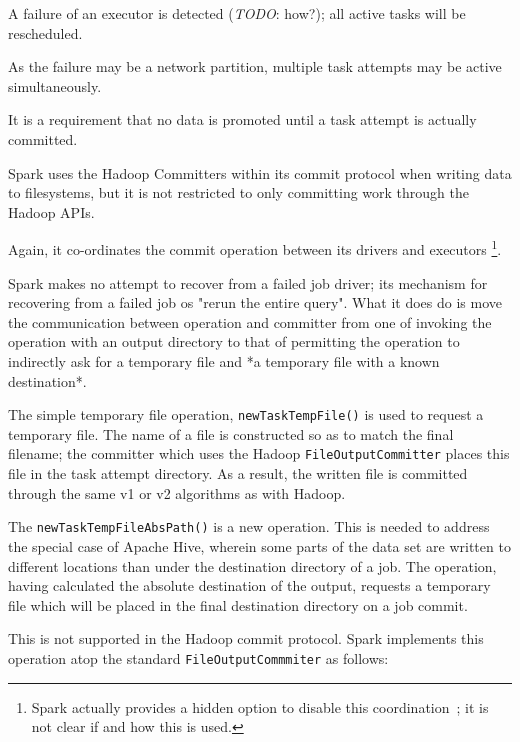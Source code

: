 \documentclass[conference]{IEEEtran}
\newcommand{\TODO}{\emph{TODO}}
\begin{document}
A failure of an executor is detected (\TODO: how?);
all active tasks will be rescheduled.

As the failure may be a network partition, multiple task attempts may be active
simultaneously.

It is a requirement that no data is promoted until a task attempt is actually
committed.


Spark uses the Hadoop Committers within its commit protocol when
writing data to filesystems, but it is not restricted to only committing work
through the Hadoop APIs.

Again, it co-ordinates the commit operation between its drivers and executors
\footnote{Spark actually provides a hidden option to disable this
coordination\ \cite{SPARK-8029}; it is not clear if and how this is used.}.

Spark makes no attempt to recover from a failed job driver;
its mechanism for recovering from a failed job os "rerun the entire query".
What it does do is move the communication between operation and committer
from one of invoking the operation with an output directory to
that of permitting the operation to indirectly ask for a temporary file
and *a temporary file with a known destination*.

The simple temporary file operation, \texttt{newTaskTempFile()} is used
to request a temporary file.
The name of a file is constructed so as to match the final filename;
the committer which uses the Hadoop \texttt{FileOutputCommitter} places this
file in the task attempt directory.
As a result, the written file is committed through the same v1 or v2 algorithms
as with Hadoop.

The \texttt{newTaskTempFileAbsPath()} is a new operation.
This is needed to address the special case of Apache Hive, wherein
some parts of the data set are written to different locations than
under the destination directory of a job.
The operation, having calculated the absolute destination of the output,
requests a temporary file which will be placed in the final destination
directory on a job commit.

This is not supported in the Hadoop commit protocol.
Spark implements this operation atop the standard \texttt{FileOutputCommmiter}
as follows:
\end{document}
